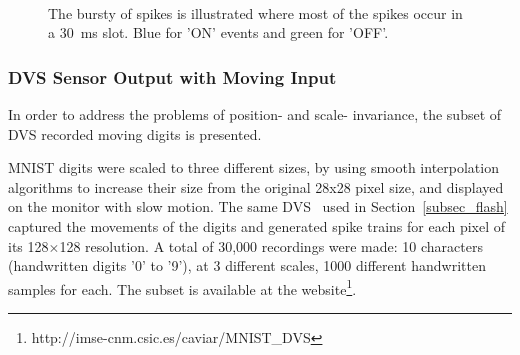 	\begin{figure}[b!]
	  \centering
	  	  \\

	  \caption{The bursty of spikes is illustrated where most of the spikes occur in a 30~ms slot. Blue for 'ON' events and green for 'OFF'.}
	  \label{fig:flash}
	\end{figure}
	\subsubsection{DVS Sensor Output with Moving Input}
	In order to address the problems of position- and scale- invariance, the subset of DVS recorded moving digits is presented.
	
	MNIST digits were scaled to three different sizes, by using smooth interpolation algorithms to increase their size from the original 28x28 pixel size, and displayed on the monitor with slow motion. 
	The same DVS~\cite{serrano-gotarredona_128_2013} used in Section~\ref{subsec_flash} captured the movements of the digits and generated spike trains for each pixel of its 128$\times$128 resolution.
	A total of 30,000 recordings were made: 10 characters (handwritten digits '0' to '9'), at 3 different scales, 1000 different handwritten samples for each.
	The subset is available at the website\footnote {http://imse-cnm.csic.es/caviar/MNIST\_DVS}.
	